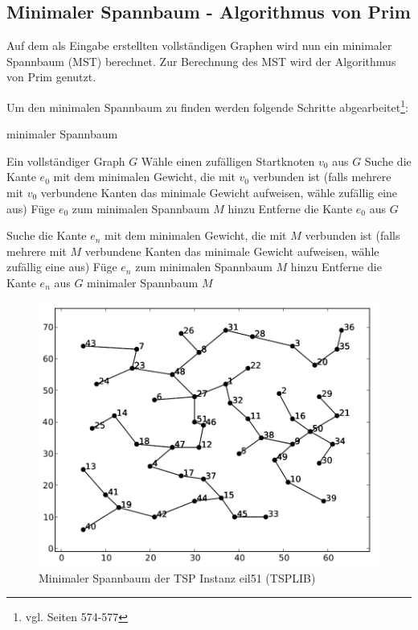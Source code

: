 \documentclass[11pt,a4paper]{article}
\begin{document}
\newpage

\subsection{Minimaler Spannbaum - Algorithmus von Prim}
Auf dem als Eingabe erstellten vollständigen Graphen wird nun ein minimaler Spannbaum (MST) berechnet. Zur Berechnung des MST wird der Algorithmus von Prim genutzt.

Um den minimalen Spannbaum zu finden werden folgende Schritte abgearbeitet\footnote{vgl. \cite{cormen07} Seiten 574-577}:

\begin{algorithm}[H]
    \renewcommand{\algorithmicrequire}{\textbf{Eingabe:}}
    \renewcommand{\algorithmicensure}{\textbf{Ausgabe:}}
    \caption{minimaler Spannbaum}

    \begin{algorithmic}[1]
    \REQUIRE Ein vollständiger Graph $G$
        \STATE Wähle einen zufälligen Startknoten $v_0$ aus $G$
        \STATE Suche die Kante $e_0$ mit dem minimalen Gewicht, die mit $v_0$ verbunden ist (falls mehrere mit $v_0$ verbundene Kanten das minimale Gewicht aufweisen, wähle zufällig eine aus)
        \STATE Füge $e_0$ zum minimalen Spannbaum $M$ hinzu
        \STATE Entferne die Kante $e_0$ aus $G$

            \STATE Suche die Kante $e_n$ mit dem minimalen Gewicht, die mit $M$ verbunden ist (falls mehrere mit $M$ verbundene Kanten das minimale Gewicht aufweisen, wähle zufällig eine aus)
            \STATE Füge $e_n$ zum minimalen Spannbaum $M$ hinzu
            \STATE Entferne die Kante $e_n$ aus $G$
        \ENDWHILE
    \ENSURE minimaler Spannbaum $M$
    \end{algorithmic}
\end{algorithm}

\begin{figure}[H]
        \centering
        \includegraphics[width=12cm]{gfx/eil51_mst}
        \caption{Minimaler Spannbaum der TSP Instanz eil51 (TSPLIB)}
        \label{img:eil51_mst}
\end{figure}
\end{document}
